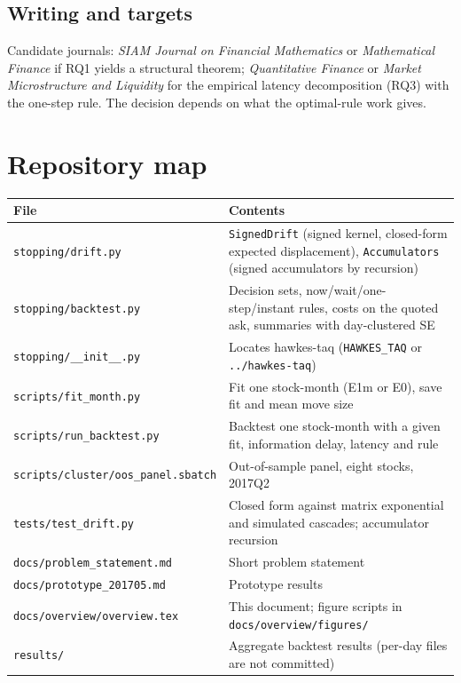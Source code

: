 \documentclass[11pt]{article}
\theoremstyle{definition}
\theoremstyle{remark}
\newcommand{\Eo}{\textsf{E0}}
\newcommand{\Em}{\textsf{E1m}}
\newcommand{\file}[1]{\texttt{#1}}
\begin{document}
\subsection{Writing and targets}
Candidate journals: \emph{SIAM Journal on Financial Mathematics} or \emph{Mathematical Finance} if RQ1 yields a structural theorem; \emph{Quantitative Finance} or \emph{Market Microstructure and Liquidity} for the empirical latency decomposition (RQ3) with the one-step rule. The decision depends on what the optimal-rule work gives.

\appendix
\section{Repository map}

\begin{center}
\small
\begin{tabularx}{\textwidth}{@{}p{6.4cm}L@{}}
\toprule
File & Contents \\
\midrule
\file{stopping/drift.py} & \file{SignedDrift} (signed kernel, closed-form expected displacement), \file{Accumulators} (signed accumulators by recursion) \\
\file{stopping/backtest.py} & Decision sets, now/wait/one-step/instant rules, costs on the quoted ask, summaries with day-clustered SE \\
\file{stopping/\_\_init\_\_.py} & Locates hawkes-taq (\file{HAWKES\_TAQ} or \file{../hawkes-taq}) \\
\file{scripts/fit\_month.py} & Fit one stock-month (\Em{} or \Eo), save fit and mean move size \\
\file{scripts/run\_backtest.py} & Backtest one stock-month with a given fit, information delay, latency and rule \\
\file{scripts/cluster/oos\_panel.sbatch} & Out-of-sample panel, eight stocks, 2017Q2 \\
\file{tests/test\_drift.py} & Closed form against matrix exponential and simulated cascades; accumulator recursion \\
\file{docs/problem\_statement.md} & Short problem statement \\
\file{docs/prototype\_201705.md} & Prototype results \\
\file{docs/overview/overview.tex} & This document; figure scripts in \file{docs/overview/figures/} \\
\file{results/} & Aggregate backtest results (per-day files are not committed) \\
\bottomrule
\end{tabularx}
\end{center}
\end{document}
